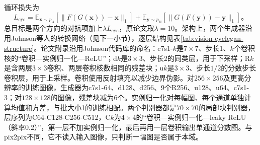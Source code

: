 循环损失为
\begin{equation}
 L_{\mathrm{cyc}}=
 \mathbb{E}_{\bm{x}\sim p_A}
 [\lVert F(G(\bm{x}))-\bm{x}\rVert_1]
 +
 \mathbb{E}_{\bm{y}\sim p_B}
 [\lVert G(F(\bm{y}))-\bm{y}\rVert_1]\text{。}
 \label{eq:vision-cycle-consistency}
\end{equation}
总目标是两个方向的对抗项加上$\lambda L_{\mathrm{cyc}}$，原论文取$\lambda=10$。架构上，两个生成器沿用Johnson等人的转换网络（见下一小节），逐层结构见表\ref{tab:vision-cyclegan-structure}。论文附录沿用Johnson代码库的命名：c7s1-$k$是$7\times7$、步长1、$k$个卷积核的“卷积—实例归一化—ReLU”；d$k$是$3\times3$、步长2的同类层，用于下采样；R$k$是含两层$3\times3$卷积、两层卷积核数相同的残差块；u$k$是$3\times3$、步长$1/2$的分数步长卷积层，用于上采样。卷积使用反射填充以减少边界伪影。对$256\times256$及更高分辨率的训练图像，生成器为c7s1-64、d128、d256、9个R256、u128、u64、c7s1-3；对$128\times128$的图像，残差块减为6个。实例归一化对每幅图、每个通道单独计算均值和方差，与批大小1的训练相配。两个判别器都是$70\times70$的局部块判别器，层序列为C64-C128-C256-C512，C$k$为$4\times4$的“卷积—实例归一化—leaky ReLU（斜率0.2）”，第一层不加实例归一化，最后再用一层卷积输出单通道分数图。与pix2pix不同，它不读入输入图像，只判断一幅图是否属于本域。

